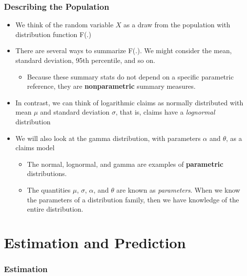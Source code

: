\documentclass[]{book}
\providecommand{\tightlist}{%
  \setlength{\itemsep}{0pt}\setlength{\parskip}{0pt}}
\theoremstyle{definition}
\theoremstyle{definition}
\theoremstyle{definition}
\theoremstyle{remark}
\begin{document}
\subsubsection{Describing the
Population}\label{describing-the-population}

\begin{itemize}
\item
  We think of the random variable \(X\) as a draw from the population
  with distribution function F(.)
\item
  There are several ways to summarize F(.). We might consider the mean,
  standard deviation, 95th percentile, and so on.

  \begin{itemize}
  \tightlist
  \item
    Because these summary stats do not depend on a specific parametric
    reference, they are \textbf{nonparametric} summary measures.
  \end{itemize}
\item
  In contrast, we can think of logarithmic claims as normally
  distributed with mean \(\mu\) and standard deviation \(\sigma\), that
  is, claims have a \emph{lognormal} distribution
\item
  We will also look at the gamma distribution, with parameters
  \(\alpha\) and \(\theta\), as a claims model

  \begin{itemize}
  \item
    The normal, lognormal, and gamma are examples of \textbf{parametric}
    distributions.
  \item
    The quantities \(\mu\), \(\sigma\), \(\alpha\), and \(\theta\) are
    known as \emph{parameters}. When we know the parameters of a
    distribution family, then we have knowledge of the entire
    distribution.
  \end{itemize}
\end{itemize}

\section{Estimation and Prediction}\label{estimation-and-prediction}

\subsubsection{Estimation}\label{estimation}
\end{document}
